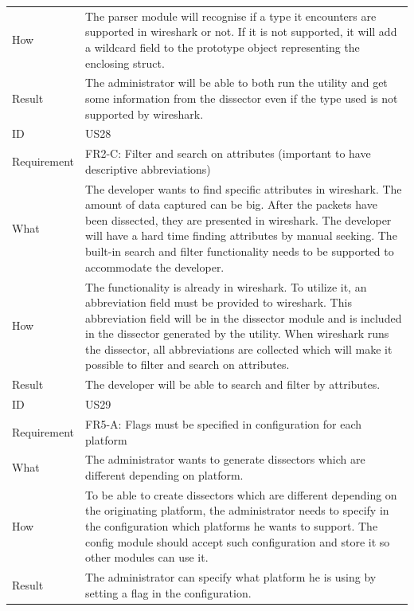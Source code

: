 \begin{table}[htbp]
{\begin{tabularx}{1.2\textwidth}{l X}
	How & The \gls{parser} module will recognise if a type it encounters are supported in \Gls{wireshark} or not. If it is not supported, it will add a \gls{wildcard} field to the prototype object
	representing the enclosing \gls{struct}. \\
	Result & The administrator will be able to both run the \gls{utility} and get some information from the \gls{dissector} even if the type used is not supported by \Gls{wireshark}. \\
	\midrule
	ID & US28 \\
	Requirement & FR2-C: Filter and search on attributes (important to have descriptive abbreviations) \\
	What & The developer wants to find specific attributes in \Gls{wireshark}. The amount of data captured can be big.
	After the \glspl{packet} have been dissected, they are presented in \Gls{wireshark}. The developer will have a hard time finding 
	attributes by manual seeking. The built-in search and filter functionality needs to be supported to accommodate the developer. \\
	How & The functionality is already in \Gls{wireshark}. To utilize it, an abbreviation field must be provided to \Gls{wireshark}. This abbreviation field will be in the \gls{dissector} module
	and is included in the \gls{dissector} generated by the \gls{utility}. When \Gls{wireshark} runs the \gls{dissector}, all abbreviations are collected which will make it possible to filter and search
	on attributes. \\
	Result & The developer will be able to search and filter by attributes. \\
	\midrule
	ID & US29 \\
	Requirement & FR5-A: Flags must be specified in configuration for each platform \\
	What & The administrator wants to generate \glspl{dissector} which are different depending on platform. \\
	How & To be able to create \glspl{dissector} which are different depending on the originating platform, the administrator needs to specify in the configuration which platforms he wants to support.
	The config module should accept such configuration and store it so other modules can use it. \\ 
	Result & The administrator can specify what platform he is using by setting a flag in the configuration. \\
	\midrule
\end{tabularx}}
\end{table}

